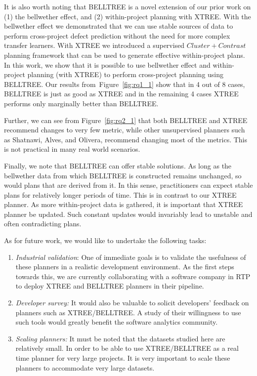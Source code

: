 \documentclass[10pt,journal,compsoc]{IEEEtran}
\newcommand{\be}{\begin{enumerate}}
\newcommand{\ee}{\end{enumerate}}
\newcommand{\fig}[1]{Figure~\ref{fig:#1}}
\begin{document}
It is also worth noting that BELLTREE is a novel extension of our prior work on (1) the bellwether effect, and (2) within-project planning with XTREE. With the bellwether effect we demonstrated that we can use stable sources of data to perform cross-project defect prediction without the need for more complex transfer learners. With XTREE we introduced a supervised $Cluster+Contrast$ planning framework that can be used to generate effective within-project plans. In this work, we show that it is possible to use bellwether effect and within-project planning (with  XTREE) to perform cross-project planning using BELLTREE. Our results from~\fig{rq1_1} show that in 4 out of 8 cases, BELLTREE is just as good as XTREE and in the remaining 4 cases XTREE performs only marginally better than BELLTREE.

Further, we can see from \fig{rq2_1} that both BELLTREE and XTREE recommend changes to very few metric, while other unsupervised planners such as Shatnawi, Alves, and Olivera, recommend changing most of the metrics. This is not practical in many real world scenarios.

Finally, we note that BELLTREE can offer stable solutions. As long as the bellwether data from which BELLTREE is constructed remains unchanged, so would plans that are derived from it. In this sense, practitioners can expect stable plans for relatively longer periods of time. This is in contrast to our XTREE planner. As more within-project data is gathered,  it is important that XTREE planner be updated. Such constant updates would invariably lead to unstable and often contradicting plans.


As for future work, we would like to undertake the following tasks:
\be
\item \textit{Industrial validation}: One of immediate goals is to validate the usefulness of these planners in a realistic development environment. As the first steps towards this, we are currently collaborating with a software company in RTP to deploy XTREE and BELLTREE planners in their pipeline. 
\item \textit{Developer survey: }It would also be valuable to solicit developers' feedback on planners such as XTREE/BELLTREE. A study of their willingness to use such tools would greatly benefit the software analytics community.
\item \textit{Scaling planners:} It must be noted that the datasets studied here are relatively small. In order to be able to use XTREE/BELLTREE as a real time planner for very large projects. It is very important to scale these planners to accommodate very large datasets.
\ee

\balance


\end{document}

